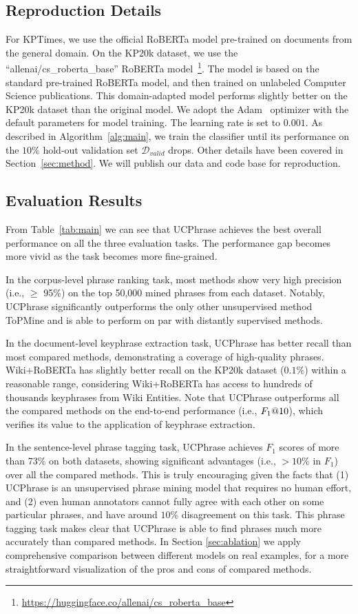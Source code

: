 \documentclass[sigconf]{acmart}
\newcommand{\our}{\mbox{UCPhrase}\xspace}
\newcommand{\smtx}[1]{\scriptsize{#1}}
\newcommand{\myfootnote}[2]{\footnote{\scriptsize{#1} \href{#2}{\scriptsize{#2}}}}
\begin{document}
\subsection{Reproduction Details}
For KPTimes, we use the official RoBERTa model pre-trained on documents from the general domain. 
On the KP20k dataset, we use the ``allenai/cs\_roberta\_base'' RoBERTa model~\cite{gururangan2020don}\myfootnote{}{https://huggingface.co/allenai/cs\_roberta\_base}.
The model is based on the standard pre-trained RoBERTa model, and then trained on unlabeled Computer Science publications.
This domain-adapted model performs slightly better on the KP20k dataset than the original model.
We adopt the Adam~\cite{kingma2015adam} optimizer with the default parameters for model training.
The learning rate is set to $0.001$.
As described in Algorithm~\ref{alg:main}, we train the classifier until its performance on the $10\%$ hold-out validation set $\mathcal{D}_{valid}$ drops.
Other details have been covered in Section~\ref{sec:method}.
We will publish our data and code base for reproduction.



\subsection{Evaluation Results}
From Table~\ref{tab:main} we can see that \our achieves the best overall performance on all the three evaluation tasks.
The performance gap becomes more vivid as the task becomes more fine-grained.

In the corpus-level phrase ranking task, most methods show very high precision (i.e., $\ge$ 95\%) on the top 50,000 mined phrases from each dataset. 
Notably, \our significantly outperforms the only other unsupervised method ToPMine and is able to perform on par with distantly supervised methods.

In the document-level keyphrase extraction task, \our has better recall than most compared methods, demonstrating a coverage of high-quality phrases.
Wiki+RoBERTa has slightly better recall on the KP20k dataset ($0.1\%$) within a reasonable range, considering Wiki+RoBERTa has access to hundreds of thousands keyphrases from Wiki Entities.
Note that \our outperforms all the compared methods on the end-to-end performance (i.e., $F_1\smtx{@10}$), which verifies its value to the application of keyphrase extraction.

In the sentence-level phrase tagging task, \our achieves $F_1$ scores of more than 73\% on both datasets, showing significant advantages (i.e., $> 10\%$ in $F_1$) over all the compared methods.
This is truly encouraging given the facts that (1) \our is an unsupervised phrase mining model that requires no human effort, and (2) even human annotators cannot fully agree with each other on some particular phrases, and have around $10\%$ disagreement on this task. 
This phrase tagging task makes clear that \our is able to find phrases much more accurately than compared methods.
In Section \ref{sec:ablation} we apply comprehensive comparison between different models on real examples, for a more straightforward visualization of the pros and cons of compared methods.
\end{document}
